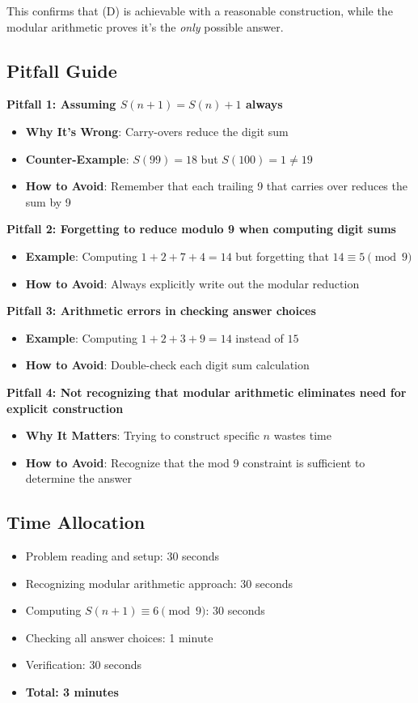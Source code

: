 \documentclass[]{article}
\begin{document}
\begin{solutionbox}
This confirms that (D) is achievable with a reasonable construction, while the modular arithmetic proves it's the \textit{only} possible answer.

\subsection*{Pitfall Guide}

\textbf{Pitfall 1: Assuming $S(n+1) = S(n) + 1$ always}
\begin{itemize}
    \item \textbf{Why It's Wrong}: Carry-overs reduce the digit sum
    \item \textbf{Counter-Example}: $S(99) = 18$ but $S(100) = 1 \neq 19$
    \item \textbf{How to Avoid}: Remember that each trailing 9 that carries over reduces the sum by 9
\end{itemize}

\textbf{Pitfall 2: Forgetting to reduce modulo 9 when computing digit sums}
\begin{itemize}
    \item \textbf{Example}: Computing $1+2+7+4 = 14$ but forgetting that $14 \equiv 5 \pmod{9}$
    \item \textbf{How to Avoid}: Always explicitly write out the modular reduction
\end{itemize}

\textbf{Pitfall 3: Arithmetic errors in checking answer choices}
\begin{itemize}
    \item \textbf{Example}: Computing $1+2+3+9 = 14$ instead of $15$
    \item \textbf{How to Avoid}: Double-check each digit sum calculation
\end{itemize}

\textbf{Pitfall 4: Not recognizing that modular arithmetic eliminates need for explicit construction}
\begin{itemize}
    \item \textbf{Why It Matters}: Trying to construct specific $n$ wastes time
    \item \textbf{How to Avoid}: Recognize that the mod 9 constraint is sufficient to determine the answer
\end{itemize}

\subsection*{Time Allocation}
\begin{itemize}
    \item Problem reading and setup: 30 seconds
    \item Recognizing modular arithmetic approach: 30 seconds
    \item Computing $S(n+1) \equiv 6 \pmod{9}$: 30 seconds
    \item Checking all answer choices: 1 minute
    \item Verification: 30 seconds
    \item \textbf{Total: 3 minutes}
\end{itemize}


\end{solutionbox}
\end{document}

